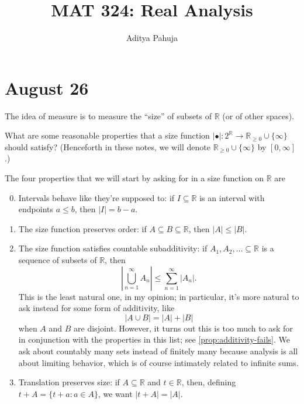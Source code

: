 \documentclass[11pt]{scrartcl}
\title{\vspace{-2em}MAT 324: Real Analysis}
\author{\large Aditya Pahuja}
\date{}
\providecommand{\RR}{\mathbb R}
\providecommand{\ii}{\item}
\providecommand{\abs}[1]{\left\lvert #1\right\rvert}
\begin{document}
\maketitle
\tableofcontents

\pagebreak

\section{August 26}\label{sec:aug26}

The idea of measure is to measure the ``size'' of subsets of $\RR$
(or of other spaces).

\begin{exercise}
    What are some reasonable properties that a size function
    $\abs{\bullet}\colon 2^\RR\to\RR_{\ge0}\cup\{\infty\}$ should satisfy?
    (Henceforth in these notes, we will denote
    $\RR_{\ge0}\cup\{\infty\}$ by $[0,\infty]$.)
\end{exercise}

The four properties that we will start by asking for
in a size function on $\RR$ are
\begin{enumerate}[(1)]
    \setcounter{enumi}{-1}
    \ii Intervals behave like they're supposed to:
    if $I\subseteq\RR$ is an interval with endpoints $a\le b$,
    then $|I| = b-a$.
    \ii The size function preserves order:
    if $A\subseteq B\subseteq\RR$, then $|A|\le |B|$.
    \ii The size function satisfies countable subadditivity:
    if $A_1,A_2,\ldots\subseteq\RR$ is a sequence of subsets of $\RR$, then
    \begin{equation*}
	\abs{\bigcup_{n=1}^\infty A_n} \le \sum_{n=1}^\infty \abs{A_n}.
    \end{equation*}
    This is the least natural one, in my opinion;
    in particular, it's more natural to ask instead for
    some form of additivity, like
    \begin{equation*}
	|A\cup B| = |A| + |B|
    \end{equation*}
    when $A$ and $B$ are disjoint.
    However, it turns out this is too much to ask for
    in conjunction with the properties in this list;
    see \autoref{prop:additivity-fails}.
    We ask about countably many sets instead of finitely many
    because analysis is all about limiting behavior,
    which is of course intimately related to infinite sums.
    \ii Translation preserves size:
    if $A\subseteq\RR$ and $t\in\RR$, then, defining
    $t + A = \{t + a : a\in A\}$, we want $\abs{t+A} = \abs{A}$.
\end{enumerate}
\end{document}
